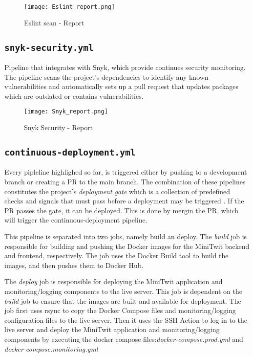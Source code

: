 \begin{figure}[H]
    \centering
    \texttt{[image: Eslint\_report.png]}
    \caption{Eslint scan - Report}
    \label{fig:elsint_report}
\end{figure}

\subsection{\texttt{snyk-security.yml}}
Pipeline that integrates with Snyk, which provide continues security monitoring. The pipeline scans the project's dependencies to identify any known vulnerabilities and automatically sets up a pull request that updates packages which are outdated or contains vulnerabilities. 

\begin{figure}[H]
    \centering
    \texttt{[image: Snyk\_report.png]}
    \caption{Snyk Security - Report}
    \label{fig:snyk_report}
\end{figure}

\subsection{\texttt{continuous-deployment.yml}}
Every pipleline highlighed so far, is triggered either by pushing to a development branch or creating a PR to the main branch. The combination of these pipelines constitutes the project's \textit{deployment gate } which is a collection of predefined checks and signals that must pass before a deployment may be triggered \cite{DevOps_gates}. If the PR passes the gate, it can be deployed. This is done by mergin the PR, which will trigger the continuous-deployment pipeline.

This pipeline is separated into two jobs, namely build an deploy. The \textit{build} job is responsible for building and pushing the Docker images for the MiniTwit backend and frontend, respectively. The job uses the Docker Build tool to build the images, and then pushes them to Docker Hub.

The \textit{deploy} job is responsible for deploying the MiniTwit application and monitoring/logging components to the live server. This job is dependent on the \textit{build} job to ensure that the images are built and available for deployment. The job first uses rsync to copy the Docker Compose files and monitoring/logging configuration files to the live server. Then it uses the SSH Action to log in to the live server and deploy the MiniTwit application and monitoring/logging components by  executing the docker compose files:\textit{docker-compose.prod.yml} and \textit{docker-compose.monitoring.yml}

